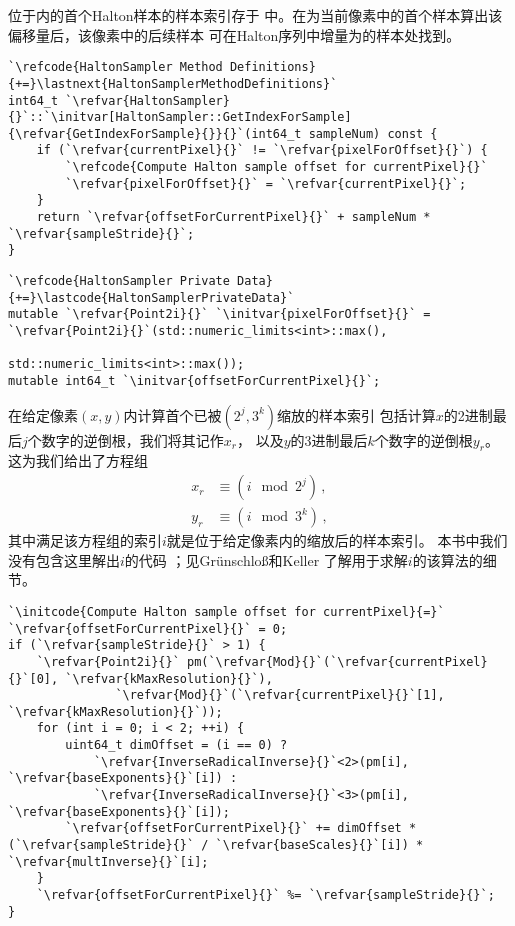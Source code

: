 位于内的首个Halton样本的样本索引存于
中。在为当前像素中的首个样本算出该偏移量后，该像素中的后续样本
可在Halton序列中增量为的样本处找到。
\begin{lstlisting}
`\refcode{HaltonSampler Method Definitions}{+=}\lastnext{HaltonSamplerMethodDefinitions}`
int64_t `\refvar{HaltonSampler}{}`::`\initvar[HaltonSampler::GetIndexForSample]{\refvar{GetIndexForSample}{}}{}`(int64_t sampleNum) const {
    if (`\refvar{currentPixel}{}` != `\refvar{pixelForOffset}{}`) {
        `\refcode{Compute Halton sample offset for currentPixel}{}`
        `\refvar{pixelForOffset}{}` = `\refvar{currentPixel}{}`;
    }
    return `\refvar{offsetForCurrentPixel}{}` + sampleNum * `\refvar{sampleStride}{}`;
}
\end{lstlisting}
\begin{lstlisting}
`\refcode{HaltonSampler Private Data}{+=}\lastcode{HaltonSamplerPrivateData}`
mutable `\refvar{Point2i}{}` `\initvar{pixelForOffset}{}` = `\refvar{Point2i}{}`(std::numeric_limits<int>::max(),
                                         std::numeric_limits<int>::max());
mutable int64_t `\initvar{offsetForCurrentPixel}{}`;
\end{lstlisting}

在给定像素$(x,y)$内计算首个已被$(2^j,3^k)$缩放的样本索引
包括计算$x$的2进制最后$j$个数字的逆倒根，我们将其记作$x_r$，
以及$y$的3进制最后$k$个数字的逆倒根$y_r$。这为我们给出了方程组
\begin{align*}
    x_r & \equiv(i \mod 2^j)\, , \\
    y_r & \equiv(i \mod 3^k)\, ,
\end{align*}
其中满足该方程组的索引$i$就是位于给定像素内的缩放后的样本索引。
本书中我们没有包含这里解出$i$的代码{}
；见Gr\"{u}nschlo\ss{}和Keller \parencite*{10.1007/978-3-642-04107-5_25}
了解用于求解$i$的该算法的细节。
\begin{lstlisting}
`\initcode{Compute Halton sample offset for currentPixel}{=}`
`\refvar{offsetForCurrentPixel}{}` = 0;
if (`\refvar{sampleStride}{}` > 1) {
    `\refvar{Point2i}{}` pm(`\refvar{Mod}{}`(`\refvar{currentPixel}{}`[0], `\refvar{kMaxResolution}{}`),
               `\refvar{Mod}{}`(`\refvar{currentPixel}{}`[1], `\refvar{kMaxResolution}{}`));
    for (int i = 0; i < 2; ++i) {
        uint64_t dimOffset = (i == 0) ?
            `\refvar{InverseRadicalInverse}{}`<2>(pm[i], `\refvar{baseExponents}{}`[i]) :
            `\refvar{InverseRadicalInverse}{}`<3>(pm[i], `\refvar{baseExponents}{}`[i]);
        `\refvar{offsetForCurrentPixel}{}` += dimOffset * (`\refvar{sampleStride}{}` / `\refvar{baseScales}{}`[i]) * `\refvar{multInverse}{}`[i];
    }
    `\refvar{offsetForCurrentPixel}{}` %= `\refvar{sampleStride}{}`;
}
\end{lstlisting}

